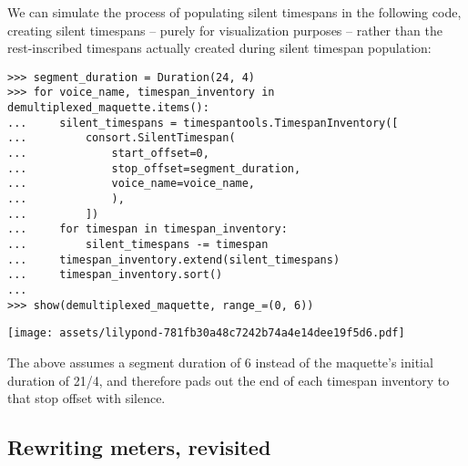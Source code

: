 \noindent We can simulate the process of populating silent timespans in the
following code, creating silent timespans -- purely for visualization purposes
-- rather than the rest-inscribed timespans actually created during silent
timespan population:

\begin{comment}
<abjad>
segment_duration = Duration(24, 4)
for voice_name, timespan_inventory in demultiplexed_maquette.items():
    silent_timespans = timespantools.TimespanInventory([
        consort.SilentTimespan(
            start_offset=0,
            stop_offset=segment_duration,
            voice_name=voice_name,
            ),
        ])
    for timespan in timespan_inventory:
        silent_timespans -= timespan
    timespan_inventory.extend(silent_timespans)
    timespan_inventory.sort()

show(demultiplexed_maquette, range_=(0, 6))
</abjad>
\end{comment}

\begin{abjadbookoutput}
\begin{singlespacing}
\vspace{-0.5\baselineskip}
\begin{verbatim}
>>> segment_duration = Duration(24, 4)
>>> for voice_name, timespan_inventory in demultiplexed_maquette.items():
...     silent_timespans = timespantools.TimespanInventory([
...         consort.SilentTimespan(
...             start_offset=0,
...             stop_offset=segment_duration,
...             voice_name=voice_name,
...             ),
...         ])
...     for timespan in timespan_inventory:
...         silent_timespans -= timespan
...     timespan_inventory.extend(silent_timespans)
...     timespan_inventory.sort()
...
>>> show(demultiplexed_maquette, range_=(0, 6))
\end{verbatim}
\noindent\texttt{[image: assets/lilypond-781fb30a48c7242b74a4e14dee19f5d6.pdf]}
\end{singlespacing}
\end{abjadbookoutput}

\noindent The above assumes a segment duration of 6 instead of the maquette's
initial duration of 21/4, and therefore pads out the end of each timespan
inventory to that stop offset with silence.

\subsection{Rewriting meters, revisited}
\label{ssec:rewriting-meters-revisited}

